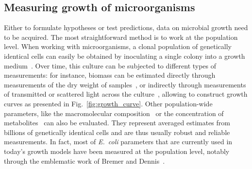 

\subsection{Measuring growth of microorganisms}

Either to formulate hypotheses or test predictions, data on microbial growth need to be acquired.
The most straightforward method is to work at the population level.
When working with microorganisms, a clonal population of genetically identical cells can easily be obtained by inoculating a single colony into a growth medium~\cite{schaechter_microbe_2006}.
Over time, this culture can be subjected to different types of measurements: for instance, biomass can be estimated  directly through measurements of the dry weight of samples~\cite{monod_growth_1949}, or indirectly through measurements of transmitted or scattered light across the culture~\cite{volkmer_condition-dependent_2011}, allowing to construct growth curves as presented in Fig.~\ref{fig:growth_curve}.
Other population-wide parameters, like the macromolecular composition~\cite{scott_interdependence_2010,scott_bacterial_2011} or the concentration of metabolites~\cite{bennett_absolute_2009} can also be evaluated.
They represent averaged estimates from billions of genetically identical cells and are thus usually robust and reliable measurements.
In fact, most of \textit{E.~coli} parameters that are currently used in today's growth models have been measured at the population level, notably through the emblematic work of Bremer and Dennis~\cite{churchward_macromolecular_1982,bremer_modulation_1996,bremer_free_2003,bremer_feedback_2008}.

